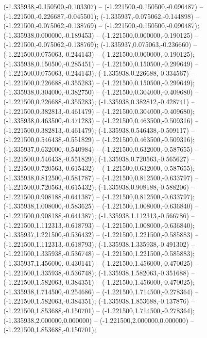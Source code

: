  (-1.335938,-0.150500,-0.103307) -- (-1.221500,-0.150500,-0.090487) -- (-1.221500,-0.226687,-0.045501);
 (-1.335937,-0.075062,-0.144898) -- (-1.221500,-0.075062,-0.138769) -- (-1.221500,-0.150500,-0.090487);
 (-1.335938,0.000000,-0.189453) -- (-1.221500,0.000000,-0.190125) -- (-1.221500,-0.075062,-0.138769);
 (-1.335937,0.075063,-0.236660) -- (-1.221500,0.075063,-0.244143) -- (-1.221500,0.000000,-0.190125);
 (-1.335938,0.150500,-0.285451) -- (-1.221500,0.150500,-0.299649) -- (-1.221500,0.075063,-0.244143);
 (-1.335938,0.226688,-0.334567) -- (-1.221500,0.226688,-0.355283) -- (-1.221500,0.150500,-0.299649);
 (-1.335938,0.304000,-0.382750) -- (-1.221500,0.304000,-0.409680) -- (-1.221500,0.226688,-0.355283);
 (-1.335938,0.382812,-0.428741) -- (-1.221500,0.382813,-0.461479) -- (-1.221500,0.304000,-0.409680);
 (-1.335938,0.463500,-0.471283) -- (-1.221500,0.463500,-0.509316) -- (-1.221500,0.382813,-0.461479);
 (-1.335938,0.546438,-0.509117) -- (-1.221500,0.546438,-0.551829) -- (-1.221500,0.463500,-0.509316);
 (-1.335937,0.632000,-0.540984) -- (-1.221500,0.632000,-0.587655) -- (-1.221500,0.546438,-0.551829);
 (-1.335938,0.720563,-0.565627) -- (-1.221500,0.720563,-0.615432) -- (-1.221500,0.632000,-0.587655);
 (-1.335938,0.812500,-0.581787) -- (-1.221500,0.812500,-0.633797) -- (-1.221500,0.720563,-0.615432);
 (-1.335938,0.908188,-0.588206) -- (-1.221500,0.908188,-0.641387) -- (-1.221500,0.812500,-0.633797);
 (-1.335938,1.008000,-0.583625) -- (-1.221500,1.008000,-0.636840) -- (-1.221500,0.908188,-0.641387);
 (-1.335938,1.112313,-0.566786) -- (-1.221500,1.112313,-0.618793) -- (-1.221500,1.008000,-0.636840);
 (-1.335937,1.221500,-0.536432) -- (-1.221500,1.221500,-0.585883) -- (-1.221500,1.112313,-0.618793);
 (-1.335938,1.335938,-0.491302) -- (-1.221500,1.335938,-0.536748) -- (-1.221500,1.221500,-0.585883);
 (-1.335937,1.456000,-0.430141) -- (-1.221500,1.456000,-0.470025) -- (-1.221500,1.335938,-0.536748);
 (-1.335938,1.582063,-0.351688) -- (-1.221500,1.582063,-0.384351) -- (-1.221500,1.456000,-0.470025);
 (-1.335938,1.714500,-0.254686) -- (-1.221500,1.714500,-0.278364) -- (-1.221500,1.582063,-0.384351);
 (-1.335938,1.853688,-0.137876) -- (-1.221500,1.853688,-0.150701) -- (-1.221500,1.714500,-0.278364);
 (-1.335938,2.000000,0.000000) -- (-1.221500,2.000000,0.000000) -- (-1.221500,1.853688,-0.150701);
